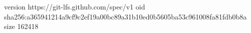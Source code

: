 version https://git-lfs.github.com/spec/v1
oid sha256:a365941214a9cf9c2ef19a00bc89a31b10ed0b5605ba53c961008fa81fdb0b8a
size 162418

